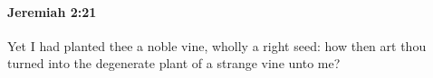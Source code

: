
		\paragraph{Jeremiah 2:21} %
			\label{JEREMIAH-2-21}

			Yet I had planted thee a noble vine, wholly a right seed: how then art thou turned into the degenerate plant of a strange vine unto me?


